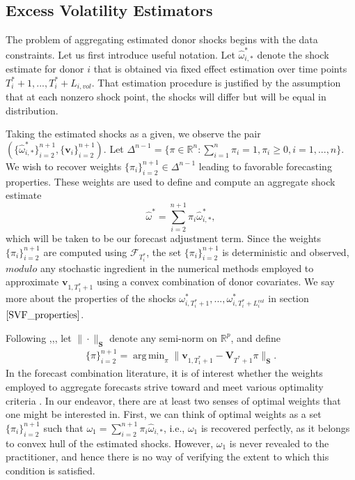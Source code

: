 \documentclass{uiucthesis2021}
\newcommand{\weight}{\pi}
\newcommand{\x}{\textbf{v}}
\newcommand{\V}{\textbf{V}}
\DeclareMathOperator*{\argmin}{arg\,min} %
\theoremstyle{definition}
\begin{document}
    \subsection{Excess Volatility Estimators}
    \label{Excess Volatility Estimators}
   
    The problem of aggregating estimated donor shocks begins with the data constraints.  Let us first introduce useful notation.  Let $\hat\omega^{*}_{i,*}$ denote the shock estimate for donor $i$ that is obtained via fixed effect estimation over time points $T_{i}^{*}+1,...,T_{i}^{*}+L_{i,vol}$.  That estimation procedure is justified by the assumption that at each nonzero shock point, the shocks will differ but will be equal in distribution.  
    
    Taking the estimated shocks as a given, we observe the pair $(\{\hat\omega^{*}_{i,*}\}^{n+1}_{i=2},\{\textbf{v}_{i}\}^{n+1}_{i=2})$.  Let $\Delta^{n-1} = \{\pi \in \mathbb{R}^n: \sum_{i=1}^n \pi_i = 1, \pi_i \geq 0, i = 1,...,n\}$.  We wish to recover weights $\{\weight_{i}\}^{n+1}_{i=2} \in \Delta^{n-1}$ leading to favorable forecasting properties.  These weights are used to define and compute an aggregate shock estimate 
\begin{equation} \label{adjustment}
	  \hat\omega^{*} = \sum^{n+1}_{i=2}\weight_{i}\hat\omega^{*}_{i,*},
\end{equation}
    which will be taken to be our forecast adjustment term.  Since the weights $\{\weight_{i}\}_{i=2}^{n+1}$ are computed using $\mathcal{F}_{T^{*}_{i}}$, the set $\{\weight_{i}\}_{i=2}^{n+1}$ is deterministic and observed, $\textit{modulo}$ any stochastic ingredient in the numerical methods employed to approximate $\x_{1,T_{1}^{*}+1}$ using a convex combination of donor covariates.  We say more about the properties of the shocks $\omega^{*}_{i,T_{i}^{*}+1},...,\omega^{*}_{i,T_{i}^{*}+L^{vol}_{i}}$ in section $\ref{SVF_properties}$. 

    Following \cite[][]{abadie2003economic},\cite[][]{abadie2010synthetic},\cite[][]{lin2021minimizing}, let $\|\cdot\|_{\textbf{S}}$ denote any semi-norm on $\mathbb{R}^{p}$, and define
    \begin{align*}
    \{\pi\}_{i=2}^{n+1} = \argmin_{\pi}\|\x_{1,T_{1}^* + 1} - \V_{T^* + 1}\pi\|_{\textbf{S}}. 
    \end{align*}
In the forecast combination literature, it is of interest whether the weights employed to aggregate forecasts strive toward and meet various optimality criteria \cite[][]{timmermann2006forecast,wang2023forecast}.  In our endeavor, there are at least two senses of optimal weights that one might be interested in.  First, we can think of optimal weights as a set $\{\weight_{i}\}_{i=2}^{n+1}$ such that $\omega_{1} = \sum^{n+1}_{i=2}\weight_{i}\hat\omega_{i,*}$, i.e., $\omega_{1}$ is recovered perfectly, as it belongs to convex hull of the estimated shocks. However, $\omega_{1}$ is never revealed to the practitioner, and hence there is no way of verifying the extent to which this condition is satisfied.
\end{document}
